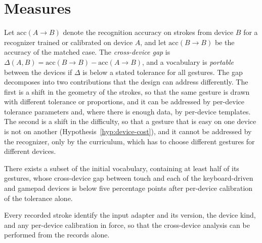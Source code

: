 \section{Measures}

Let $\mathrm{acc}(A\to B)$ denote the recognition accuracy on strokes from device $B$ for a recognizer trained or calibrated on device $A$, and let $\mathrm{acc}(B\to B)$ be the accuracy of the matched case. The \emph{cross-device gap} is $\Delta(A,B)=\mathrm{acc}(B\to B)-\mathrm{acc}(A\to B)$, and a vocabulary is \emph{portable} between the devices if $\Delta$ is below a stated tolerance for all gestures. The gap decomposes into two contributions that the design can address differently. The first is a shift in the geometry of the strokes, so that the same gesture is drawn with different tolerance or proportions, and it can be addressed by per-device tolerance parameters and, where there is enough data, by per-device templates. The second is a shift in the difficulty, so that a gesture that is easy on one device is not on another (Hypothesis~\ref{hyp:device-cost}), and it cannot be addressed by the recognizer, only by the curriculum, which has to choose different gestures for different devices.

\begin{hypothesis}\label{hyp:portable}
There exists a subset of the initial vocabulary, containing at least half of its gestures, whose cross-device gap between touch and each of the keyboard-driven and gamepad devices is below five percentage points after per-device calibration of the tolerance alone.\evH
\end{hypothesis}

\begin{requirement}\label{req:device-metadata}
Every recorded stroke \must{} identify the input adapter and its version, the device kind, and any per-device calibration in force, so that the cross-device analysis can be performed from the records alone.\evS
\end{requirement}
